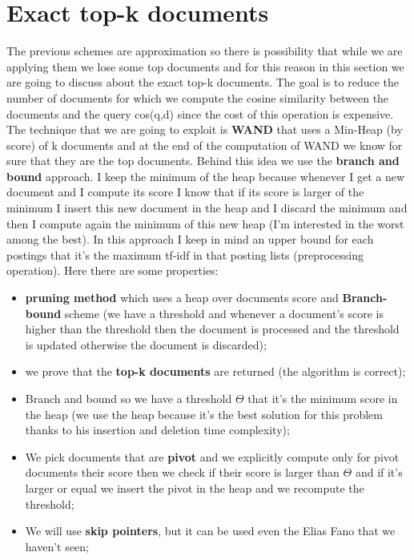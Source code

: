 \section{Exact top-k documents}
The previous schemes are approximation so there is possibility that while we are applying them we lose some top documents and for this reason in this section we are going to discuss about the exact top-k documents.\newline
The goal is to reduce the number of documents for which we compute the cosine similarity between the documents and the query cos(q,d) since the cost of this operation is expensive.\newline
The technique that we are going to exploit is \textbf{WAND} that uses a Min-Heap (by score) of k documents and at the end of the computation of WAND we know for sure that they are the top documents. Behind this idea we use the \textbf{branch and bound} approach.
I keep the minimum of the heap because whenever I get a new document and I compute its score I know that if its score is larger of the minimum I insert this new document in the heap and I discard the minimum and then I compute again the minimum of this new heap (I'm interested in the worst among the best).\newline
In this approach I keep in mind an upper bound for each postings that it's the maximum tf-idf in that posting lists (preprocessing operation).\newline
Here there are some properties:
\begin{itemize}
    \item \textbf{pruning method} which uses a heap over documents score and \textbf{Branch-bound} scheme (we have a threshold and whenever a document's score is higher than the threshold then the document is processed and the threshold is updated otherwise the document is discarded);
    \item we prove that the \textbf{top-k documents} are returned (the algorithm is correct);
    \item Branch and bound so we have a threshold $\Theta$ that it's the minimum score in the heap (we use the heap because it's the best solution for this problem thanks to his insertion and deletion time complexity);
    \item We pick documents that are \textbf{pivot} and we explicitly compute only for pivot documents their score then we check if their score is larger than $\Theta$ and if it's larger or equal we insert the pivot in the heap and we recompute the threshold;
    \item We will use \textbf{skip pointers}, but it can be used even the Elias Fano that we haven't seen;
\end{itemize}
